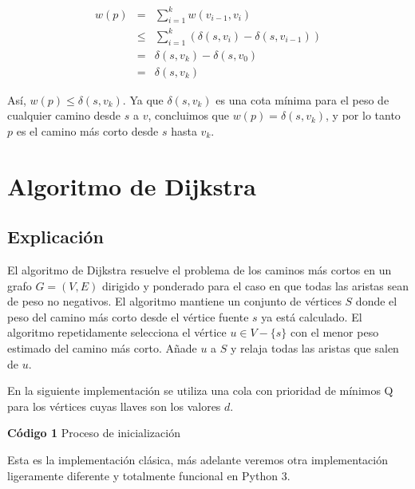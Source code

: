\documentclass[12pt]{article}
\newcommand{\nl}{\vspace{0.3cm}}
\begin{document}
\begin{eqnarray*}
	w(p) & = & \sum_{i=1}^{k} w(v_{i-1}, v_i) \\
	& \leqslant & \sum_{i=1}^{k} (\delta(s, v_i) - \delta(s, v_{i-1})) \\
	& = & \delta(s, v_k) - \delta(s, v_0) \\
	& = & \delta(s, v_k)
\end{eqnarray*}

Así, $w(p) \leqslant \delta(s, v_k)$. Ya que $\delta(s, v_k)$ es una cota mínima para el peso de cualquier camino desde $s$ a $v$, concluimos que $w(p) = \delta(s, v_k)$, y por lo tanto $p$ es el camino más corto desde $s$ hasta $v_k$.

\section{Algoritmo de Dijkstra}

\subsection{Explicación}

\nl

El algoritmo de Dijkstra resuelve el problema de los caminos más cortos en un grafo $G = (V, E)$ dirigido y ponderado para el caso en que todas las aristas sean de peso no negativos. El algoritmo mantiene un conjunto de vértices $S$ donde el peso del camino más corto desde el vértice fuente $s$ ya está calculado. El algoritmo repetidamente selecciona el vértice $u \in V - \{s\}$ con el menor peso estimado del camino más corto. Añade $u$ a $S$ y relaja todas las aristas que salen de $u$.

\nl

En la siguiente implementación se utiliza una cola con prioridad de mínimos Q para los vértices cuyas llaves son los valores $d$.

\newpage

\textbf{Código 1} Proceso de inicialización



\nl

Esta es la implementación clásica, más adelante veremos otra implementación ligeramente diferente y totalmente funcional en Python 3.

\nl
\end{document}
